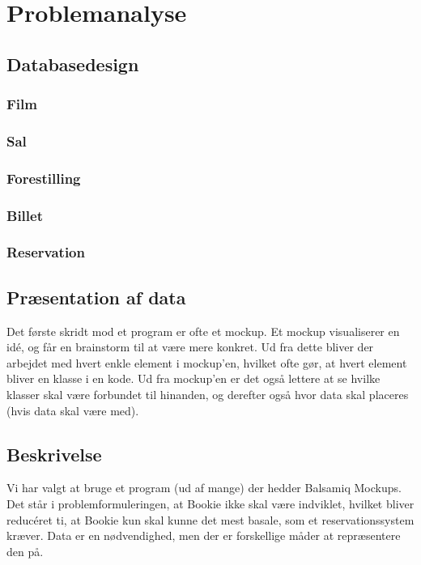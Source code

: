 \chapter{Problemanalyse}
\label{chapter:problem}

\section{Databasedesign}

\subsection{Film}

\subsection{Sal}

\subsection{Forestilling}

\subsection{Billet}

\subsection{Reservation}

\section{Præsentation af data}

Det første skridt mod et program er ofte et mockup. Et mockup visualiserer en idé, og får en brainstorm til at være mere konkret. Ud fra dette bliver der arbejdet med hvert enkle element i mockup'en, hvilket ofte gør, at hvert element bliver en klasse i en kode. Ud fra mockup'en er det også lettere at se hvilke klasser skal være forbundet til hinanden, og derefter også hvor data skal placeres (hvis data skal være med).

\section{Beskrivelse}

Vi har valgt at bruge et program (ud af mange) der hedder Balsamiq Mockups.
Det står i problemformuleringen, at Bookie ikke skal være indviklet, hvilket bliver reducéret ti, at Bookie kun skal kunne det mest basale, som et reservationssystem kræver. Data er en nødvendighed, men der er forskellige måder at repræsentere den på.

